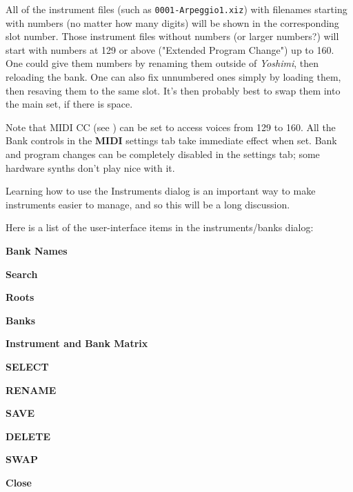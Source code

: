    All of the instrument files (such as \texttt{0001-Arpeggio1.xiz})
   with filenames starting with numbers (no matter how many digits)
   will be
   shown in the corresponding slot number.  Those instrument files
   without numbers (or larger numbers?) will start
   with numbers at 129 or above ("Extended Program Change") up to 160.
   One could give them numbers by renaming them outside of \textsl{Yoshimi},
   then reloading the bank.
   One can also fix unnumbered ones simply by loading them, then resaving them
   to the same slot. It's then probably best to swap them into the main set,
   if there is space.

   Note that MIDI CC
   (see )
   can be set to access voices from 129 to 160.
   All the Bank controls in the \textbf{MIDI} settings tab take immediate
   effect when set.
   Bank and program changes can be completely disabled in the settings tab;
   some hardware synths don't play nice with it.

   Learning how to use the Instruments dialog is an important way to make
   instruments easier to manage, and so this will be a long discussion.


   Here is a list of the user-interface items in the instruments/banks dialog:

   \begin{enumber}
      \item \textbf{Bank Names}
      \item \textbf{Search}
      \item \textbf{Roots}
      \item \textbf{Banks}
      \item \textbf{Instrument and Bank Matrix}
      \item \textbf{SELECT}
      \item \textbf{RENAME}
      \item \textbf{SAVE}
      \item \textbf{DELETE}
      \item \textbf{SWAP}
      \item \textbf{Close}
   \end{enumber}

